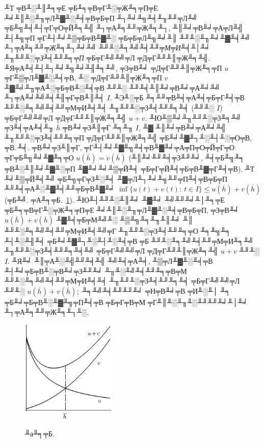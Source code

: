  ╨Т ╤В╨░╨║╨╕╤Е ╤Б╨╕╤В╤Г╨░╤Ж╨╕╤П╤Е ╨╛╨║╨░╨╖╤Л╨▓╨░╨╡╤В╤Б╤П ╨┐╨╛╨╗╨╡╨╖╨╜╤Л╨╝ ╤Б╨╗╨╡╨┤╤Г╤О╤Й╨╕╨╣ ╨┐╤А╨╕╨╜╤Ж╨╕╨┐, ╨║╨╛╤В╨╛╤А╤Л╨╣ ╨┤╨╗╤П ╤Г╨┤╨╛╨▒╤Б╤В╨▓╨░ ╤Б╤Б╤Л╨╗╨╛╨║
 ╨╜╨░╨╖╨╛╨▓╨╡╨╝ {\it ╨┐╤А╨╕╨╜╤Ж╨╕╨┐╨╛╨╝ ╨╜╨░╨╕╨╝╨╡╨╜╤М╤И╨╡╨│╨╛ ╨╖╨╜╨░╤З╨╡╨╜╨╕╤П} ╤Б╤Г╨╝╨╝╤Л ╤Д╤Г╨╜╨║╤Ж╨╕╨╣.
 ╨Я╤А╨╡╨┤╨┐╨╛╨╗╨╛╨╢╨╕╨╝, ╤З╤В╨╛ ╤Д╤Г╨╜╨║╤Ж╨╕╤П $u$ ╤Г╨▒╤Л╨▓╨░╨╡╤В, ╨░ ╤Д╤Г╨╜╨║╤Ж╨╕╤П $v$ ╨▓╨╛╨╖╤А╨░╤Б╤В╨░╨╡╤В ╨╜╨░ ╨╜╨╡╨║╨╛╤В╨╛╤А╨╛╨╝ ╨┐╤А╨╛╨╝╨╡╨╢╤Г╤В╨║╨╡
 $I.$ ╨Э╨░╤Б ╨╕╨╜╤В╨╡╤А╨╡╤Б╤Г╨╡╤В ╨╜╨░╨╕╨╝╨╡╨╜╤М╤И╨╡╨╡ ╨╖╨╜╨░╤З╨╡╨╜╨╕╨╡ (╨╜╨░ $I$)  ╤Б╤Г╨╝╨╝╤Л ╤Д╤Г╨╜╨║╤Ж╨╕╨╣ $u+v.$
 ╨Ю╨▒╨╛╨╖╨╜╨░╤З╨╕╨╝ ╤З╨╡╤А╨╡╨╖ $\overline h$ ╤В╨╛╤З╨║╤Г ╨╕╨╖  $I$, ╨▓ ╨║╨╛╤В╨╛╤А╨╛╨╣ ╨╖╨╜╨░╤З╨╡╨╜╨╕╤П ╤Д╤Г╨╜╨║╤Ж╨╕╨╣ ╤Б╨╛╨▓╨┐╨░╨┤╨░╤О╤В,
 ╤В.\,╨╡. ╤В╨╛╤З╨║╤Г, ╤Г╨┤╨╛╨▓╨╗╨╡╤В╨▓╨╛╤А╤П╤О╤Й╤Г╤О ╤Г╤Б╨╗╨╛╨▓╨╕╤О $u(\overline h)=v(\overline h)$
 (╨║╨╛╨╜╨╡╤З╨╜╨╛, ╨╡╤Б╨╗╨╕ ╤В╨░╨║╨╛╨▓╨░╤П ╨▓╨╛╨╛╨▒╤Й╨╡ ╤Б╤Г╤Й╨╡╤Б╤В╨▓╤Г╨╡╤В). ╨Т ╨╛╨▒╤Й╨╡╨╝ ╤Б╨╗╤Г╤З╨░╨╡ ╨▓╤Л╨┐╨╛╨╗╨╜╤П╨╡╤В╤Б╤П
 ╨╜╨╡╤А╨░╨▓╨╡╨╜╤Б╤В╨▓╨╛ $\inf\{u(t)+v(t):\ t\in I\}\le u(\overline h)+v(\overline
 h)$ (╤Б╨╝. ╤А╨╕╤Б.~\ref{r20-1}).
 ╨Ю╨┤╨╜╨░╨║╨╛ ╨▓╨╛ ╨╝╨╜╨╛╨│╨╕╤Е ╤Б╨╕╤В╤Г╨░╤Ж╨╕╤П╤Е ╨╛╨║╨░╨╖╤Л╨▓╨░╨╡╤В╤Б╤П, ╤З╤В╨╛  $u(\overline h)+v(\overline h)$
 ╨▓╨╡╤Б╤М╨╝╨░ ╨▒╨╗╨╕╨╖╨║╨╛ ╨║ ╨╜╨░╨╕╨╝╨╡╨╜╤М╤И╨╡╨╝╤Г ╨╖╨╜╨░╤З╨╡╨╜╨╕╤О ╨╕╨╗╨╕ ╨┤╨░╨╢╨╡ ╤Б╨╛╨▓╨┐╨░╨┤╨░╨╡╤В ╤Б ╨╜╨░╨╕╨╝╨╡╨╜╤М╤И╨╕╨╝ ╨╖╨╜╨░╤З╨╡╨╜╨╕╨╡╨╝
 ╤Б╤Г╨╝╨╝╤Л ╤Д╤Г╨╜╨║╤Ж╨╕╨╣ $u+v$ ╨╜╨░ $I.$ ╨Я╨╛ ╨║╤А╨░╨╣╨╜╨╡╨╣ ╨╝╨╡╤А╨╡, ╨▒╤Л╨▓╨░╨╡╤В ╨┤╨╛╤Б╤В╨░╤В╨╛╤З╨╜╨╛ ╨╖╨░╨╝╨╡╨╜╨╕╤В╤М ╨╜╨░╨╕╨╝╨╡╨╜╤М╤И╨╡╨╡
 ╨╖╨╜╨░╤З╨╡╨╜╨╕╨╡ ╤Б╤Г╨╝╨╝╤Л ╨╜╨░  $u(\overline h)+v(\overline h);$ ╨╕╨╝╨╡╨╜╨╜╨╛ ╤Н╤В╨╛╤В ╤И╨░╨│ ╨╕ ╤Б╨╛╤Б╤В╨░╨▓╨╗╤П╨╡╤В
 ╤Б╤Г╤В╤М ╤Г╨║╨░╨╖╨░╨╜╨╜╨╛╨│╨╛ ╨┐╤А╨╕╨╜╤Ж╨╕╨┐╨░.



\begin{figure}[ht]
\begin{center}
\includegraphics[width=0.4\textwidth]{pict/pict20-1.eps}
\end{center}
 \bigskip
 \label{r20-1}

 \centerline{╨а╨╕╤Б.~\theris}
 \bigskip
\end{figure}


